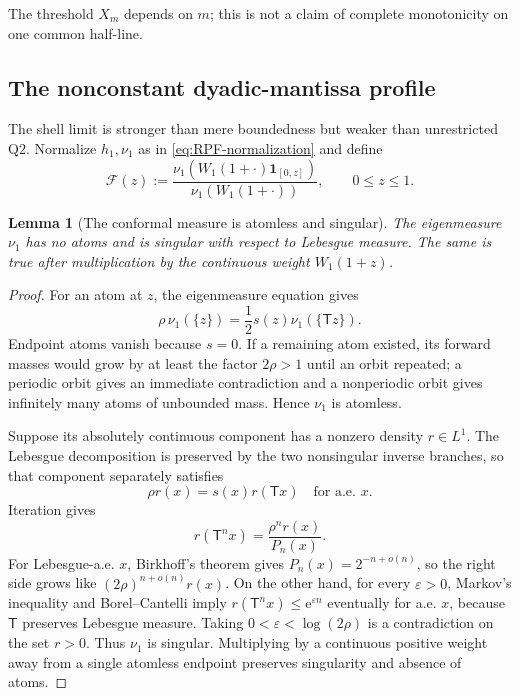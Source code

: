 \documentclass[11pt,oneside]{article}
\newtheorem{lemma}[theorem]{Lemma}
\theoremstyle{definition}
\theoremstyle{remark}
\newcommand{\e}{\mathrm e}
\newcommand{\T}{\mathsf T}
\begin{document}
The threshold $X_m$ depends on $m$; this is not a claim of complete
monotonicity on one common half-line.

\subsection{The nonconstant dyadic-mantissa profile}

The shell limit is stronger than mere boundedness but weaker than unrestricted
Q2.  Normalize $h_1,\nu_1$ as in \eqref{eq:RPF-normalization} and define
\begin{equation}
 \mathscr F(z):=
 \frac{\nu_1(W_1(1+\cdot)\mathbf1_{[0,z]})}
      {\nu_1(W_1(1+\cdot))},
 \qquad 0\le z\le1.
 \label{eq:F-profile}
\end{equation}

\begin{lemma}[The conformal measure is atomless and singular]
\label{lem:singular}
The eigenmeasure $\nu_1$ has no atoms and is singular with respect to Lebesgue
measure.  The same is true after multiplication by the continuous weight
$W_1(1+z)$.
\end{lemma}

\begin{proof}
For an atom at $z$, the eigenmeasure equation gives
\begin{equation}
 \rho\,\nu_1(\{z\})
 =\frac12s(z)\nu_1(\{\T z\}).
 \label{eq:atom-relation}
\end{equation}
Endpoint atoms vanish because $s=0$.  If a remaining atom existed, its forward
masses would grow by at least the factor $2\rho>1$ until an orbit repeated; a
periodic orbit gives an immediate contradiction and a nonperiodic orbit gives
infinitely many atoms of unbounded mass.  Hence $\nu_1$ is atomless.

Suppose its absolutely continuous component has a nonzero density $r\in L^1$.
The Lebesgue decomposition is preserved by the two nonsingular inverse
branches, so that component separately satisfies
\begin{equation}
 \rho r(x)=s(x)r(\T x)
 \quad\text{for a.e. }x.
 \label{eq:conformal-density}
\end{equation}
Iteration gives
\begin{equation}
 r(\T^nx)=\frac{\rho^nr(x)}{P_n(x)}.
 \label{eq:density-iteration}
\end{equation}
For Lebesgue-a.e. $x$, Birkhoff's theorem gives
$P_n(x)=2^{-n+o(n)}$, so the right side grows like
$(2\rho)^{n+o(n)}r(x)$.  On the other hand, for every $\varepsilon>0$,
Markov's inequality and Borel--Cantelli imply
$r(\T^nx)\le\e^{\varepsilon n}$ eventually for a.e. $x$, because $\T$
preserves Lebesgue measure.  Taking
$0<\varepsilon<\log(2\rho)$ is a contradiction on the set $r>0$.  Thus
$\nu_1$ is singular.  Multiplying by a continuous positive weight away from a
single atomless endpoint preserves singularity and absence of atoms.
\end{proof}
\end{document}
